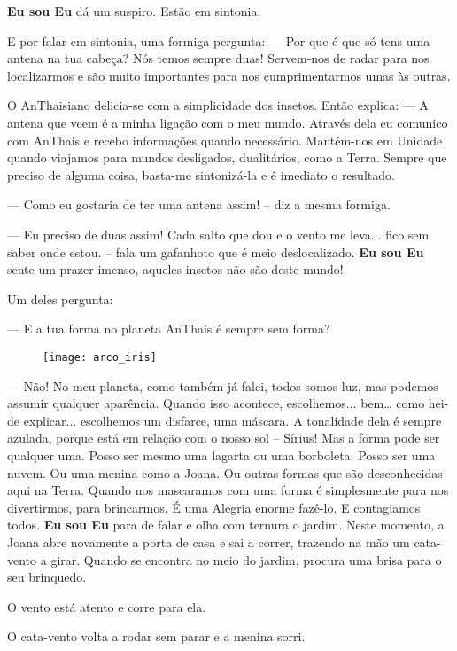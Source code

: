\textbf{Eu sou Eu} dá um suspiro. Estão em sintonia.

E por falar em sintonia, uma formiga pergunta:
\bigbreak
— Por que é que só tens uma antena na tua cabeça? Nós temos sempre duas! Servem-nos de radar para nos localizarmos e são muito importantes para nos cumprimentarmos umas às outras.

O AnThaisiano delicia-se com a simplicidade dos insetos. Então explica:
\bigbreak
— A antena que veem é a minha ligação com o meu mundo. Através dela eu comunico com AnThais e recebo informações quando necessário. Mantém-nos em Unidade quando viajamos para mundos desligados, dualitários, como a Terra. Sempre que preciso de alguma coisa, basta-me sintonizá-la e é imediato o resultado.

— Como eu gostaria de ter uma antena assim! – diz a mesma formiga.

— Eu preciso de duas assim! Cada salto que dou e o vento me leva... fico sem saber onde estou. – fala um gafanhoto que é meio deslocalizado.
\bigbreak
\textbf{Eu sou Eu} sente um prazer imenso, aqueles insetos não são deste mundo!

Um deles pergunta:

— E a tua forma no planeta AnThais é sempre sem forma?
\bigbreak
\begin{figure}[h]
    \centering
    \texttt{[image: arco\_iris]}
\end{figure}


 — Não! No meu planeta, como também já falei, todos somos luz, mas podemos assumir qualquer aparência. Quando isso acontece, escolhemos... bem… como hei-de explicar... escolhemos um disfarce, uma máscara. A tonalidade dela é sempre azulada, porque está em relação com o nosso sol – Sírius! Mas a forma pode ser qualquer uma. Posso ser mesmo uma lagarta ou uma borboleta. Posso ser uma nuvem. Ou uma menina como a Joana. Ou outras formas que são desconhecidas aqui na Terra. Quando nos mascaramos com uma forma é simplesmente para nos divertirmos, para brincarmos. É uma Alegria enorme fazê-lo. E contagiamos todos.
 \bigbreak
\textbf{Eu sou Eu} para de falar e olha com ternura o jardim. Neste momento, a Joana abre novamente a porta de casa e sai a correr, trazendo na mão um cata-vento a girar. Quando se encontra no meio do jardim, procura uma brisa para o seu brinquedo.

O vento está atento e corre para ela.

O cata-vento volta a rodar sem parar e a menina sorri.

